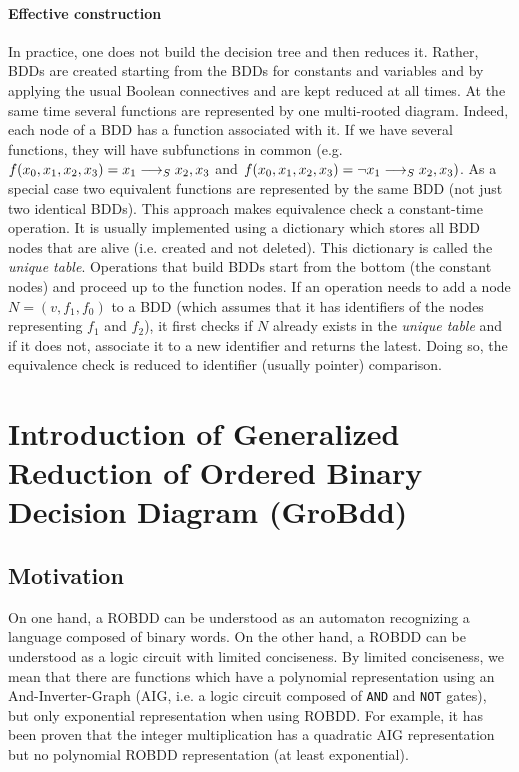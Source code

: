 \documentclass[a4paper,10pt]{article}
\begin{document}
\paragraph{Effective construction\\}
In practice, one does not build the decision tree and then reduces it.
Rather, BDDs are created starting from the BDDs for constants and variables and by applying the usual Boolean connectives and are kept reduced at all times.
At the same time several functions are represented by one multi-rooted diagram.
Indeed, each node of a BDD has a function associated with it.
If we have several functions, they will have subfunctions in common (e.g. $f(x_0, x_1, x_2, x_3) = x_1 \longrightarrow_S x_2, x_3$ and $f(x_0, x_1, x_2, x_3) = \lnot x_1 \longrightarrow_S x_2, x_3)$.
As a special case two equivalent functions are represented by the same BDD (not just two identical BDDs).
This approach makes equivalence check a constant-time operation.
It is usually implemented using a dictionary which stores all BDD nodes that are alive (i.e. created and not deleted).
This dictionary is called the \textit{unique table}.
Operations that build BDDs start from the bottom (the constant nodes) and proceed up to the function nodes.
If an operation needs to add a node $N = (v, f_1, f_0)$ to a BDD (which assumes that it has identifiers of the nodes representing $f_1$ and $f_2$), it first checks if $N$ already exists in the \textit{unique table} and if it does not, associate it to a new identifier and returns the latest.
Doing so, the equivalence check is reduced to identifier (usually pointer) comparison.

\section{Introduction of Generalized Reduction of Ordered Binary Decision Diagram (GroBdd)}

\subsection{Motivation}

On one hand, a ROBDD can be understood as an automaton recognizing a language composed of binary words.
On the other hand, a ROBDD can be understood as a logic circuit with limited conciseness.
By limited conciseness, we mean that there are functions which have a polynomial representation using an And-Inverter-Graph (AIG, i.e. a logic circuit composed of \texttt{AND} and \texttt{NOT} gates), but only exponential representation when using ROBDD.
For example, it has been proven \cite{Bryant1986} that the integer multiplication has a quadratic AIG representation but no polynomial ROBDD representation (at least exponential).
\end{document}
